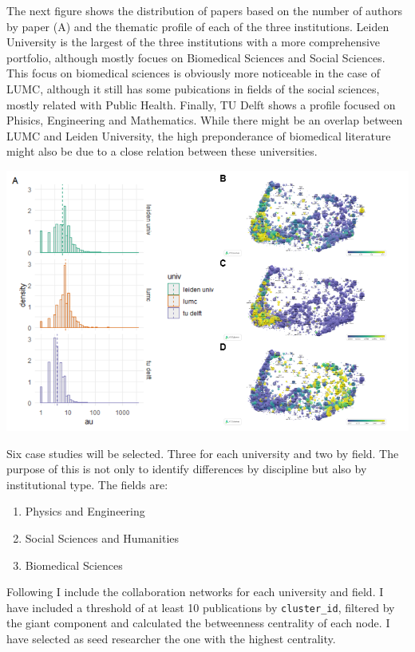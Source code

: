 \documentclass[]{article}
\providecommand{\tightlist}{%
  \setlength{\itemsep}{0pt}\setlength{\parskip}{0pt}}
\begin{document}
The next figure shows the distribution of papers based on the number of
authors by paper (A) and the thematic profile of each of the three
institutions. Leiden University is the largest of the three institutions
with a more comprehensive portfolio, although mostly focues on
Biomedical Sciences and Social Sciences. This focus on biomedical
sciences is obviously more noticeable in the case of LUMC, although it
still has some pubications in fields of the social sciences, mostly
related with Public Health. Finally, TU Delft shows a profile focused on
Phisics, Engineering and Mathematics. While there might be an overlap
between LUMC and Leiden University, the high preponderance of biomedical
literature might also be due to a close relation between these
universities.

\includegraphics{figs/histogram-profiles.png}

Six case studies will be selected. Three for each university and two by
field. The purpose of this is not only to identify differences by
discipline but also by institutional type. The fields are:

\begin{enumerate}
\def\labelenumi{\arabic{enumi}.}
\tightlist
\item
  Physics and Engineering
\item
  Social Sciences and Humanities
\item
  Biomedical Sciences
\end{enumerate}

Following I include the collaboration networks for each university and
field. I have included a threshold of at least 10 publications by
\texttt{cluster\_id}, filtered by the giant component and calculated the
betweenness centrality of each node. I have selected as seed researcher
the one with the highest centrality.
\end{document}
